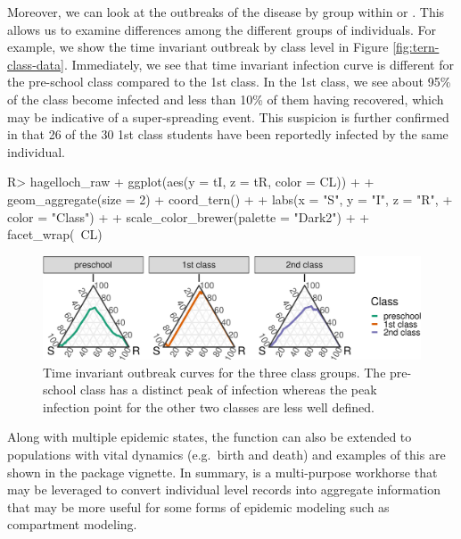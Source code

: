 \documentclass[
  shortnames]{jss}
\begin{document}
Moreover, we can look at the outbreaks of the disease by group within
 or . This allows us
to examine differences among the different groups of individuals. For
example, we show the time invariant outbreak by class level in Figure
\ref{fig:tern-class-data}. Immediately, we see that time invariant
infection curve is different for the pre-school class compared to the
1st class. In the 1st class, we see about 95\% of the class become
infected and less than 10\% of them having recovered, which may be
indicative of a super-spreading event. This suspicion is further
confirmed in that 26 of the 30 1st class students have been reportedly
infected by the same individual.

\begin{CodeChunk}
\begin{CodeInput}
R> hagelloch_raw %
+   ggplot(aes(y = tI, z = tR, color = CL)) +
+   geom_aggregate(size = 2) + coord_tern() +
+   labs(x = "S", y = "I", z = "R",
+        color = "Class") +
+   scale_color_brewer(palette = "Dark2") +
+   facet_wrap(~CL)
\end{CodeInput}
\begin{figure}[H]

{\centering \includegraphics{Figs/unnamed-chunk-10-1} 

}

\caption{\label{fig:tern-class-data}Time invariant outbreak curves for the three class groups.  The pre-school class has a distinct peak of infection whereas the peak infection point for the other two classes are less well defined.}\label{fig:unnamed-chunk-10}
\end{figure}
\end{CodeChunk}

Along with multiple epidemic states, the function
 can also be extended to populations with
vital dynamics (e.g.~birth and death) and examples of this are shown in
the package vignette. In summary,  is a
multi-purpose workhorse that may be leveraged to convert individual
level records into aggregate information that may be more useful for
some forms of epidemic modeling such as compartment modeling.
\end{document}
